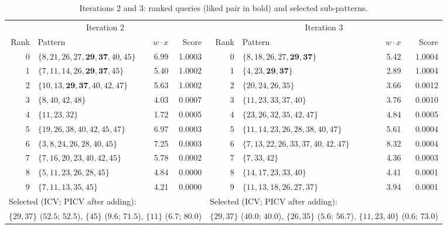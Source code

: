 \begin{table}[t]
\centering
\caption{Iterations 2 and 3: ranked queries (liked pair in bold) and selected sub-patterns.}
\label{tab:ex_iter23}
\small
\begin{tabular}{rlrr@{\hskip 2em}rlrr}
\toprule
\multicolumn{4}{c}{Iteration 2} & \multicolumn{4}{c}{Iteration 3} \\
\cmidrule(r){1-4} \cmidrule(l){5-8}
Rank & Pattern & $w\cdot x$ & Score & Rank & Pattern & $w\cdot x$ & Score \\
\midrule
0 & $\{8,21,26,27,\mathbf{29},\mathbf{37},40,45\}$ & 6.99 & 1.0003 & 0 & $\{8,18,26,27,\mathbf{29},\mathbf{37}\}$ & 5.42 & 1.0004 \\
1 & $\{7,11,14,26,\mathbf{29},\mathbf{37},45\}$    & 5.40 & 1.0002 & 1 & $\{4,23,\mathbf{29},\mathbf{37}\}$       & 2.89 & 1.0004 \\
2 & $\{10,13,\mathbf{29},\mathbf{37},40,42,47\}$   & 5.63 & 1.0002 & 2 & $\{20,24,26,35\}$                      & 3.66 & 0.0012 \\
3 & $\{8,40,42,48\}$                               & 4.03 & 0.0007 & 3 & $\{11,23,33,37,40\}$                   & 3.76 & 0.0010 \\
4 & $\{11,23,32\}$                                 & 1.72 & 0.0005 & 4 & $\{23,26,32,35,42,47\}$                & 4.84 & 0.0005 \\
5 & $\{19,26,38,40,42,45,47\}$                     & 6.97 & 0.0003 & 5 & $\{11,14,23,26,28,38,40,47\}$          & 5.61 & 0.0004 \\
6 & $\{3,8,24,26,28,40,45\}$                       & 7.25 & 0.0003 & 6 & $\{7,13,22,26,33,37,40,42,47\}$        & 8.32 & 0.0004 \\
7 & $\{7,16,20,23,40,42,45\}$                      & 5.78 & 0.0002 & 7 & $\{7,33,42\}$                          & 4.36 & 0.0003 \\
8 & $\{5,11,23,26,28,45\}$                         & 4.84 & 0.0000 & 8 & $\{14,17,23,33,40\}$                   & 4.41 & 0.0001 \\
9 & $\{7,11,13,35,45\}$                            & 4.21 & 0.0000 & 9 & $\{11,13,18,26,27,37\}$                & 3.94 & 0.0001 \\
\midrule
\multicolumn{4}{l}{Selected (ICV; PICV after adding):} & \multicolumn{4}{l}{Selected (ICV; PICV after adding):} \\
\multicolumn{4}{l}{$\{29,37\}$ ($52.5$; $52.5$), $\{45\}$ ($9.6$; $71.5$), $\{11\}$ ($6.7$; $80.0$)} &
\multicolumn{4}{l}{$\{29,37\}$ ($40.0$; $40.0$), $\{26,35\}$ ($5.6$; $56.7$), $\{11,23,40\}$ ($0.6$; $73.0$)} \\
\bottomrule
\end{tabular}
\end{table}

